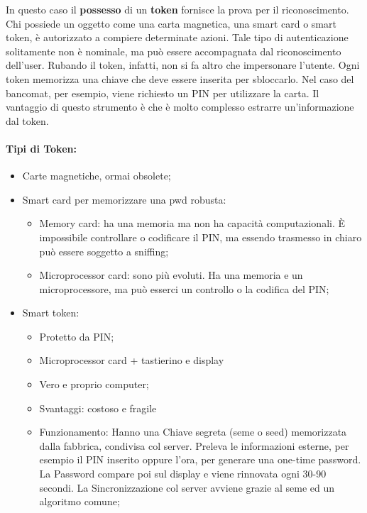 In questo caso il \textbf{possesso} di un \textbf{token} fornisce la prova per
il riconoscimento.
Chi possiede un oggetto come una carta magnetica, una smart card o smart token,
è autorizzato a compiere determinate azioni. Tale tipo di autenticazione
solitamente non è nominale, ma può essere accompagnata dal riconoscimento
dell’user. Rubando il token, infatti, non si fa altro che impersonare l’utente.
Ogni token memorizza una chiave che deve essere inserita per sbloccarlo.
Nel caso del bancomat, per esempio, viene richiesto un PIN per utilizzare la carta.
Il vantaggio di questo strumento è che è molto complesso estrarre
un’informazione dal token.

\paragraph{Tipi di Token: }

\begin{itemize}
      \item Carte magnetiche, ormai obsolete;
      \item Smart card per memorizzare una pwd robusta:
            \begin{itemize}
                  \item Memory card: ha una memoria ma non ha capacità computazionali.
                        È impossibile
                        controllare o codificare il PIN, ma essendo trasmesso in chiaro può
                        essere soggetto
                        a sniffing;
                  \item Microprocessor card: sono più evoluti. Ha una memoria e
                        un microprocessore, ma
                        può esserci un controllo o la codifica del PIN;
            \end{itemize}
      \item Smart token:
            \begin{itemize}
                  \item Protetto da PIN;
                  \item  Microprocessor card + tastierino e display
                  \item  Vero e proprio computer;
                  \item  Svantaggi: costoso e fragile
                  \item  Funzionamento: Hanno una Chiave segreta (seme o seed)
                        memorizzata dalla fabbrica,
                        condivisa col server. Preleva le informazioni esterne,
                        per esempio il PIN inserito oppure
                        l'ora, per generare una one-time password.
                        La Password compare poi sul display e viene
                        rinnovata ogni 30-90 secondi.
                        La Sincronizzazione col server avviene grazie al seme ed un
                        algoritmo comune;
            \end{itemize}
\end{itemize}

